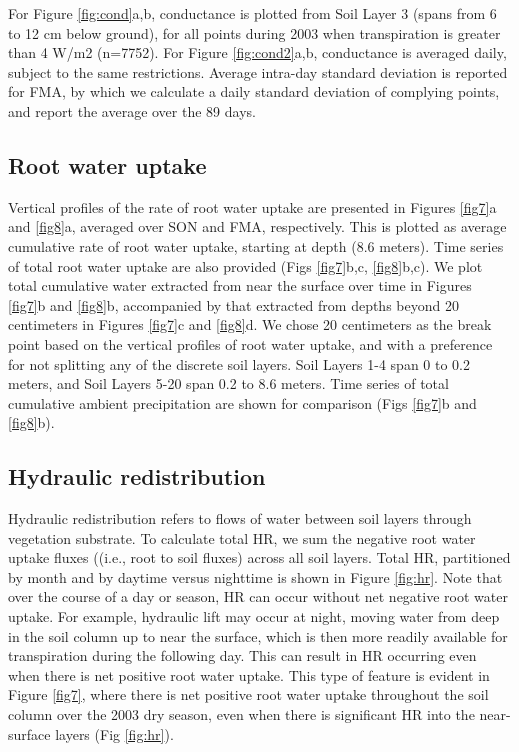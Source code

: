 \documentclass[draft,linenumbers]{agujournal}
\begin{document}
    For Figure \ref{fig:cond}a,b, conductance is plotted from Soil Layer 3 (spans from 6 to 12 cm below ground),
     for all points during 2003 when transpiration is greater than 4 W/m2 (n=7752).
    For Figure \ref{fig:cond2}a,b, conductance is averaged daily, subject to the same restrictions.
    Average intra-day standard deviation is reported for FMA, by which we calculate a daily standard deviation of complying points, and report the average over the 89 days.


\subsection{Root water uptake}
    Vertical profiles of the rate of root water uptake are presented in Figures \ref{fig7}a and \ref{fig8}a, averaged over SON and FMA, respectively.
    This is plotted as average cumulative rate of root water uptake, starting at depth (8.6 meters).
    Time series of total root water uptake are also provided (Figs \ref{fig7}b,c, \ref{fig8}b,c).
    We plot total cumulative water extracted from near the surface over time in Figures \ref{fig7}b and \ref{fig8}b, 
    accompanied by that extracted from depths beyond 20 centimeters in Figures \ref{fig7}c and \ref{fig8}d.
    We chose 20 centimeters as the break point based on the vertical profiles of root water uptake, and with a preference for not splitting any of the discrete soil layers.
    Soil Layers 1-4 span 0 to 0.2 meters, and Soil Layers 5-20 span 0.2 to 8.6 meters.
    Time series of total cumulative ambient precipitation are shown for comparison (Figs \ref{fig7}b and \ref{fig8}b).
    
        
\subsection{Hydraulic redistribution}
    Hydraulic redistribution refers to flows of water between soil layers through vegetation substrate.
    To calculate total HR, we sum the negative root water uptake fluxes ((i.e., root to soil fluxes) across all soil layers.
    Total HR, partitioned by month and by daytime versus nighttime is shown in Figure \ref{fig:hr}.
    Note that over the course of a day or season, HR can occur without net negative root water uptake.
    For example, hydraulic lift may occur at night, moving water from deep in the soil column up to near the surface, which is then more readily available for transpiration during the following day.  This can 
    result in HR occurring even when there is net positive root water uptake.
    This type of feature is evident in Figure \ref{fig7}, where there is net positive root water uptake throughout the soil column over the 2003 dry season, even when there is significant HR into the near-surface layers (Fig \ref{fig:hr}).
\end{document}
